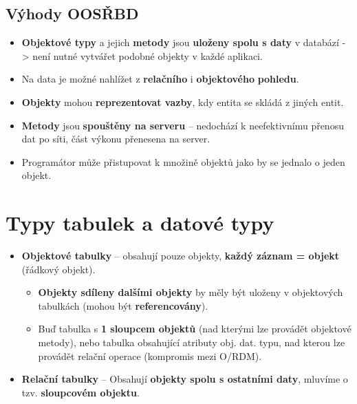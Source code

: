 \subsection{Výhody OOSŘBD}
\begin{itemize}
  \item \textbf{Objektové typy} a jejich \textbf{metody} jsou \textbf{uloženy spolu s daty} v databází -> není nutné vytvářet podobné objekty v každé aplikaci.
  \item Na data je možné nahlížet z \textbf{relačního} i \textbf{objektového} \textbf{pohledu}.
  \item \textbf{Objekty} mohou \textbf{reprezentovat vazby}, kdy entita se skládá z jiných entit.
  \item \textbf{Metody} jsou \textbf{spouštěny na serveru} -- nedochází k neefektivnímu přenosu dat po síti, část výkonu přenesena na server.
  \item Programátor může přistupovat k množině objektů jako by se jednalo o jeden objekt.
\end{itemize}

\section{Typy tabulek a datové typy}
\begin{itemize}
  \item \textbf{Objektové tabulky} -- obsahují pouze objekty, \textbf{každý záznam = objekt} (řádkový objekt).
        \begin{itemize}
          \item \textbf{Objekty sdíleny dalšími objekty} by měly být uloženy v objektových tabulkách (mohou být \textbf{referencovány}).
          \item Buď tabulka s \textbf{1 sloupcem objektů} (nad kterými lze provádět objektové metody), nebo tabulka obsahující atributy obj. dat. typu, nad kterou lze provádět relační operace (kompromis mezi O/RDM).
        \end{itemize}

  \item \textbf{Relační tabulky} -- Obsahují \textbf{objekty spolu s ostatními daty}, mluvíme o tzv. \textbf{sloupcovém objektu}.
\end{itemize}

